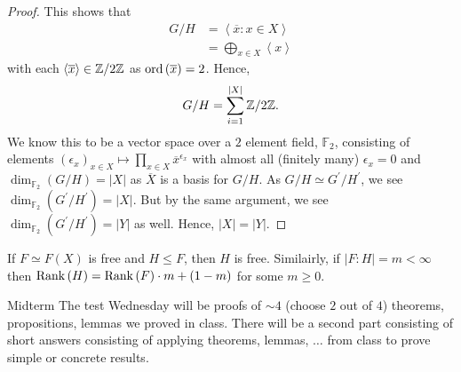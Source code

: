 \begin{proof}
	This shows that
	\begin{align*}
		G / H &=  \left<\overline{x} : x \in X \right>  \\
		&= \bigoplus _{x \in X} \left<x \right>
	\end{align*}
	with each \(\left<\overline{x} \right> \in \mathbb{Z} / 2\mathbb{Z}\)  as \(\operatorname{ord}\left( \overline{x} \right) = 2\). Hence, \[
	G / H = \sum_{i= 1}^{\left| X \right| } \mathbb{Z} / 2\mathbb{Z}
	.\]
	We know this to be a vector space over a \(2\) element field, \(\mathbb{F}_2\), consisting of elements \(\left( \epsilon_{x} \right) _{x \in X} \mapsto \prod_{x \in X}^{} \overline{x}^{\epsilon_{x}} \) with almost all (finitely many) \(\epsilon_{x} = 0\) and \(\dim_{\mathbb{F}_2} \left( G / H \right) = \left| X \right| \) as \(\overline{X}\) is a basis for \(G / H\). As \(G / H \simeq G^{\prime} / H^{\prime}\), we see \(\dim_{\mathbb{F}_2} \left( G^{\prime} / H^{\prime} \right) = \left| X \right| \). But by the same argument, we see \(\dim_{\mathbb{F}_2} \left( G^{\prime} / H^{\prime} \right) = \left| Y \right| \) as well. Hence, \(\left| X \right|  = \left| Y \right| \).
\end{proof}
\begin{remark}
	If \(F \simeq F\left( X \right) \) is free and \(H \le F\), then \(H\) is free. Similairly, if \(\left| F : H \right| = m  < \infty\) then \(\operatorname{Rank} \left( H \right)  = \operatorname{Rank}\left( F \right) \cdot m + (1-m)\) for some \( m \ge 0\).
\end{remark}
\begin{note}{Midterm}
	The test Wednesday will be proofs of \(\sim 4\) (choose \(2\) out of \(4\)) theorems, propositions, lemmas we proved in class. There will be a second part consisting of short answers consisting of applying theorems, lemmas, \(\ldots\) from class to prove simple or concrete results.
\end{note}
